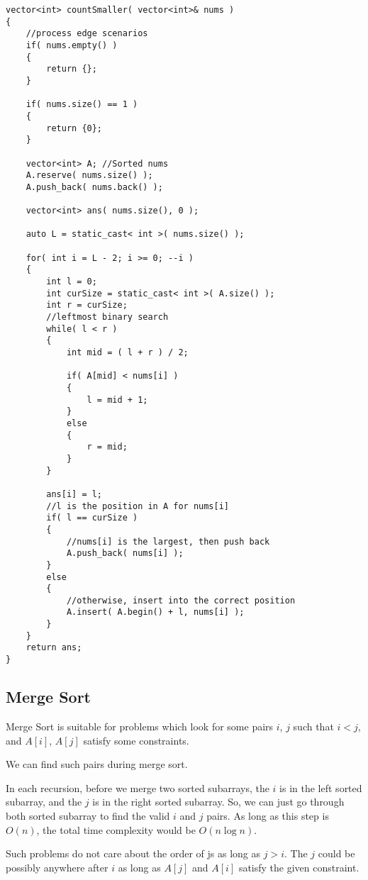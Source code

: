 \setcounter{lstlisting}{0}
\begin{lstlisting}[style=customc, caption={Binary Search And Sorting}]
vector<int> countSmaller( vector<int>& nums )
{
    //process edge scenarios
    if( nums.empty() )
    {
        return {};
    }

    if( nums.size() == 1 )
    {
        return {0};
    }

    vector<int> A; //Sorted nums
    A.reserve( nums.size() );
    A.push_back( nums.back() );

    vector<int> ans( nums.size(), 0 );

    auto L = static_cast< int >( nums.size() );

    for( int i = L - 2; i >= 0; --i )
    {
        int l = 0;
        int curSize = static_cast< int >( A.size() );
        int r = curSize;
        //leftmost binary search
        while( l < r )
        {
            int mid = ( l + r ) / 2;

            if( A[mid] < nums[i] )
            {
                l = mid + 1;
            }
            else
            {
                r = mid;
            }
        }

        ans[i] = l;
        //l is the position in A for nums[i]
        if( l == curSize )
        {
            //nums[i] is the largest, then push back
            A.push_back( nums[i] );
        }
        else
        {
            //otherwise, insert into the correct position
            A.insert( A.begin() + l, nums[i] );
        }
    }
    return ans;
}
\end{lstlisting}

\subsection{Merge Sort}
Merge Sort is suitable for problems which look for some pairs $i$, $j$
such that $i < j$, and $A[i]$, $A[j]$ satisfy some constraints.

We can find such pairs during merge sort. 

In each recursion, before we merge two sorted subarrays, the $i$ is in the left sorted subarray, and the $j$ is in the right sorted subarray. So, we can just go through both sorted subarray to find the valid $i$ and $j$ pairs. As long as this step is $O(n)$, the total time complexity would be $O(n \log n)$.

Such problems do not care about the order of js as long as $j > i$. The $j$ could be possibly anywhere after $i$ as long as $A[j]$ and $A[i]$ satisfy the given constraint. 

